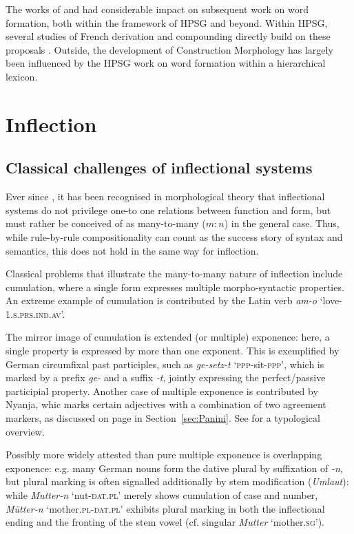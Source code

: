 \bigskip\noindent
The works of \citet{Riehemann98} and \cite{Koenig99} had considerable
impact on subsequent work on word formation, both within the framework 
of HPSG and beyond. Within HPSG, several studies of French derivation
and compounding directly build on these proposals \citep[e.g.][]{Tribout10,Desmets09}. 
Outside, the development of Construction Morphology
\citep{Booij10} has largely been influenced by the HPSG work on word
formation within a hierarchical lexicon. 

\section{Inflection}
\label{sec:Infl}

\subsection{Classical challenges of inflectional systems}
\label{sec:InflChallenges}

Ever since \citet{Matthews72}, it has been recognised in morphological
theory that inflectional systems do not privilege one-to one relations
between function and form, but must rather be conceived of as
many-to-many ($m:n$) in the general case. Thus, while
rule-by-rule compositionality can count as the success story
of syntax and semantics, this does not hold in the same way for inflection. 

Classical problems that illustrate the many-to-many nature of
inflection include cumulation, where a single form expresses multiple
morpho-syntactic properties. An extreme example of cumulation is
contributed by the Latin verb \textit{am-o}
`love-1.\textsc{s}.\textsc{prs}.\textsc{ind}.\textsc{av}'. 

The mirror image of cumulation is extended (or multiple) exponence:
here, a single property is expressed by more than one exponent. This
is exemplified by German circumfixal past participles, such as
\textit{ge-setz-t} `\textsc{ppp}-sit-\textsc{ppp}', which is
 marked by a prefix \textit{ge-} and a suffix \textit{-t},
jointly expressing the perfect/passive participial property. Another
case of multiple exponence is contributed by Nyanja, whic marks
certain adjectives with a combination of two agreement markers, as
discussed on page \pageref{Nyanja} in
Section~\ref{sec:Panini}.  See
\citet{caballero_g-harris_a12,Harris17} for a typological overview. 

Possibly more widely attested than pure multiple exponence is
overlapping exponence: e.g. many German nouns form the dative plural
by suffixation of \textit{-n}, but plural marking is often signalled
additionally by stem modification (\textit{Umlaut}): while \textit{Mutter-n}
`nut-\textsc{dat.pl}' merely shows cumulation of case and number,
\textit{Mütter-n} `mother.\textsc{pl}-\textsc{dat.pl}' exhibits plural
marking in both the inflectional ending and the fronting of the stem
vowel (cf. singular \textit{Mutter} `mother.\textsc{sg}').     


